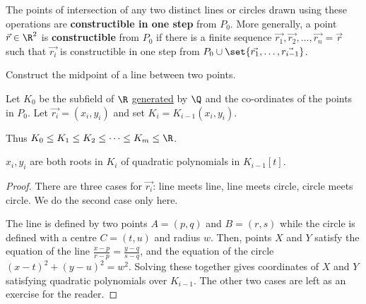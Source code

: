 \documentclass{article}
\begin{document}
\begin{ndef}
    The points of intersection of any two distinct lines or circles drawn using these operations are \textbf{constructible in one step} from $P_0$.
    More generally, a point $\vec{r} \in \R^2$ is \textbf{constructible} from $P_0$ if there is a finite sequence $\vec{r_1}, \vec{r_2}, \dotsc, \vec{r_n} = \vec{r}$ such that $\vec{r_i}$ is constructible in one step from $P_0 \cup \set{\vec{r_1}, \dotsc, \vec{r_{i-1}}}$.
\end{ndef}

\begin{exercise}
    Construct the midpoint of a line between two points.
\end{exercise}

Let $K_0$ be the subfield of $\R$ \hyperlink{def:genField}{generated} by $\Q$ and the co-ordinates of the points in $P_0$. Let $\vec{r_i} = (x_i, y_i)$ and set $K_i = K_{i-1} (x_i, y_i)$.

Thus $K_0 \leq K_1 \leq K_2 \leq \dots \leq K_m \leq \R$.

\begin{nlemma}\label{lem:1.13}
    $x_i, y_i$ are both roots in $K_i$ of quadratic polynomials in $K_{i-1}[t]$.
\end{nlemma}

\begin{proof}
    There are three cases for $\vec{r_i}$: line meets line, line meets circle, circle meets circle. We do the second case only here.
    \begin{center}
    \end{center}
    The line is defined by two points $A = (p, q)$ and $B = (r, s)$ while the circle is defined with a centre $C = (t, u)$ and radius $w$.
    Then, points $X$ and $Y$ satisfy the equation of the line $\frac{x-p}{r-p} = \frac{y-q}{s-q}$, and the equation of the circle $(x-t)^2 + (y-u)^2 = w^2$.
    Solving these together gives coordinates of $X$ and $Y$ satisfying quadratic polynomials over $K_{i-1}$.
    The other two cases are left as an exercise for the reader.
\end{proof}
\end{document}
